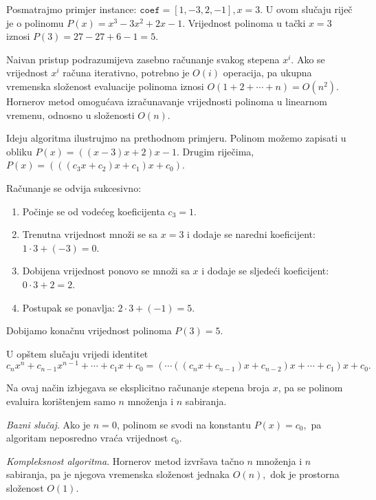  \begin{solution}
 	
 	Posmatrajmo primjer instance: $\texttt{coef}=[1,-3,2,-1], x=3.$ U ovom slučaju riječ je o polinomu $
 	P(x)=x^3-3x^2+2x-1.$ Vrijednost polinoma u tački $x=3$ iznosi $P(3)=27-27+6-1=5.$
 	
 	\medskip
 	
 	Naivan pristup podrazumijeva zasebno računanje svakog stepena $x^i$. Ako se vrijednost $x^i$ računa iterativno, potrebno je $O(i)$ operacija, pa ukupna vremenska složenost evaluacije polinoma iznosi $
 	O(1+2+\cdots+n)=O(n^2).$  	Hornerov metod omogućava izračunavanje vrijednosti polinoma u linearnom vremenu, odnosno u složenosti $O(n)$.
 	
 	Ideju algoritma ilustrujmo na prethodnom primjeru. Polinom možemo zapisati u obliku $P(x)=((x-3)x+2)x-1.$ Drugim riječima, $P(x)=(((c_3x+c_2)x+c_1)x+c_0).$
 	
 	Računanje se odvija sukcesivno:
 	
 	\begin{enumerate}
 		\item Počinje se od vodećeg koeficijenta $c_3=1$.
 		\item Trenutna vrijednost množi se sa $x=3$ i dodaje se naredni koeficijent: $1\cdot 3+(-3)=0.$
 		\item Dobijena vrijednost ponovo se množi sa $x$ i dodaje se sljedeći koeficijent: $ 0\cdot 3+2=2.$
 		\item Postupak se ponavlja: $2 \cdot 3+(-1)=5.$
 	\end{enumerate}
 	
 	Dobijamo konačnu vrijednost polinoma $	P(3)=5.$
 	
 	\medskip
 	
 	U opštem slučaju vrijedi identitet $$
 	c_nx^n+c_{n-1}x^{n-1}+\cdots+c_1x+c_0
 	=(\cdots((c_nx+c_{n-1})x+c_{n-2})x+\cdots+c_1)x+c_0.
 	$$
 	
 	Na ovaj način izbjegava se eksplicitno računanje stepena broja $x$, pa se polinom evaluira korištenjem samo $n$ množenja i $n$ sabiranja.
 	
 	\medskip
 	
 	\textit{Bazni slučaj}. Ako je $n=0$, polinom se svodi na konstantu $	P(x)=c_0,$ 	pa algoritam neposredno vraća vrijednost $c_0$.
 	
 	\medskip
 	
 	\textit{Kompleksnost algoritma}. Hornerov metod izvršava tačno $n$ množenja i $n$ sabiranja, pa je njegova vremenska složenost jednaka $
 	O(n),$	dok je prostorna složenost $O(1)$.
 \end{solution}
 
